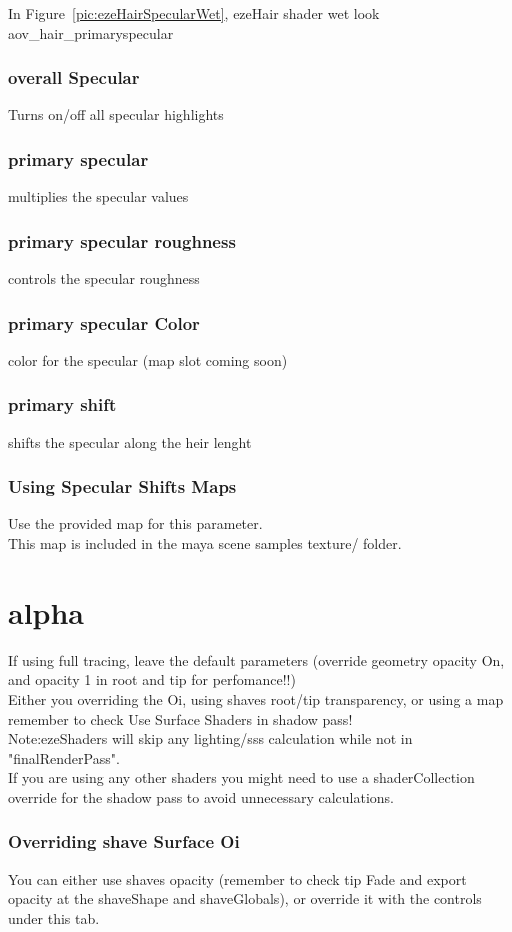 \documentclass[final,letterpaper,twoside,12pt]{report}
\begin{document}
\noindent In Figure~{\ref{pic:ezeHairSpecularWet}}, ezeHair shader wet look aov\_hair\_primaryspecular

\subsubsection {overall Specular}
Turns on/off all specular highlights
\smallskip
\subsubsection {primary specular}
multiplies the specular values
\smallskip
\subsubsection {primary specular roughness}
controls the specular roughness
\smallskip
\subsubsection {primary specular Color}
color for the specular (map slot coming soon)
\smallskip
\subsubsection {primary shift}
shifts the specular along the heir lenght
\smallskip
\subsubsection {Using Specular Shifts Maps}
Use the provided map for this parameter.\\
This map is included in the maya scene samples texture/ folder.
\smallskip
\section {alpha}
If using full tracing, leave the default parameters (override geometry opacity On, and opacity 1 in root and tip for perfomance!!)\\
Either you overriding the Oi, using shaves root/tip transparency, or using a map remember to check Use Surface Shaders in shadow pass!\\
Note:ezeShaders will skip any lighting/sss calculation while not in "finalRenderPass".\\
If you are using any other shaders you might need to use a shaderCollection override for the shadow pass to avoid unnecessary calculations.
\subsubsection {Overriding shave Surface Oi}
You can either use shaves opacity (remember to check tip Fade and export opacity at the shaveShape and shaveGlobals), or override it with the controls under this tab.
\end{document}
